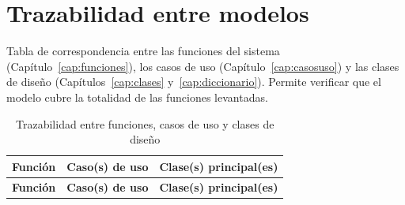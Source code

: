 \chapter{Trazabilidad entre modelos}
\label{anexo:trazabilidad}

Tabla de correspondencia entre las funciones del sistema (Capítulo~\ref{cap:funciones}), los casos
de uso (Capítulo~\ref{cap:casosuso}) y las clases de diseño (Capítulos~\ref{cap:clases}
y~\ref{cap:diccionario}). Permite verificar que el modelo cubre la totalidad de las funciones
levantadas.

{\estilotabla
\begin{longtable}{L{0.16\textwidth} L{0.24\textwidth} L{0.54\textwidth}}

\caption{Trazabilidad entre funciones, casos de uso y clases de diseño}
\label{tab:trazabilidad}
\\

\toprule
\textbf{Función} & \textbf{Caso(s) de uso} & \textbf{Clase(s) principal(es)} \\
\midrule
\endfirsthead

\toprule
\textbf{Función} & \textbf{Caso(s) de uso} & \textbf{Clase(s) principal(es)} \\
\midrule
\endhead


\end{longtable}}
